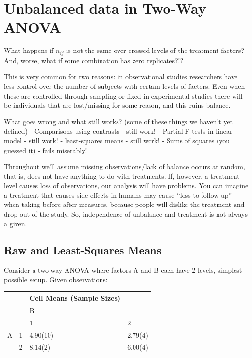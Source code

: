 \documentclass[
]{book}
\begin{document}
\hypertarget{unbalanced-data-in-two-way-anova}{%
\chapter{Unbalanced data in Two-Way ANOVA}\label{unbalanced-data-in-two-way-anova}}

What happens if \(n_{ij}\) is not the same over crossed levels of the treatment factors? And, worse, what if some combination has zero replicates?!?

This is very common for two reasons: in observational studies researchers have less control over the number of subjects with certain levels of factors. Even when these are controlled through sampling or fixed in experimental studies there will be individuals that are lost/missing for some reason, and this ruins balance.

What goes wrong and what still works? (some of these things we haven't yet defined)
- Comparisons using contrasts - still work!
- Partial F tests in linear model - still work!
- least-squares means - still work!
- Sums of squares (you guessed it) - fails miserably!

Throughout we'll assume missing observations/lack of balance occurs at random, that is, does not have anything to do with treatments. If, however, a treatment level causes loss of observations, our analysis will have problems. You can imagine a treatment that causes side-effects in humans may cause ``loss to follow-up'' when taking before-after measures, because people will dislike the treatment and drop out of the study. So, independence of unbalance and treatment is not always a given.

\hypertarget{raw-and-least-squares-means}{%
\section{Raw and Least-Squares Means}\label{raw-and-least-squares-means}}

Consider a two-way ANOVA where factors A and B each have 2 levels, simplest possible setup. Given observations:

\begin{longtable}[]{@{}llll@{}}
\toprule()
& & Cell Means (Sample Sizes) & \\
\midrule()
\endhead
& & B & \\
& & 1 & 2 \\
A & 1 & 4.90(10) & 2.79(4) \\
& 2 & 8.14(2) & 6.00(4) \\
\bottomrule()
\end{longtable}
\end{document}
